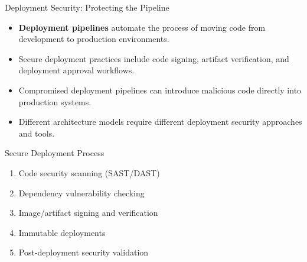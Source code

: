 \documentclass{beamer}
\begin{document}
        \begin{frame}{Deployment Security: Protecting the Pipeline}
        \begin{itemize}
        \item \textbf{Deployment pipelines} automate the process of moving code from development to production environments.
        \item Secure deployment practices include code signing, artifact verification, and deployment approval workflows.
        \item Compromised deployment pipelines can introduce malicious code directly into production systems.
        \item Different architecture models require different deployment security approaches and tools.
        \end{itemize}
        
        \begin{block}{Secure Deployment Process}
        \begin{enumerate}
        \item Code security scanning (SAST/DAST)
        \item Dependency vulnerability checking
        \item Image/artifact signing and verification
        \item Immutable deployments
        \item Post-deployment security validation
\end{enumerate}
\end{block}
\end{frame}
\end{document}
